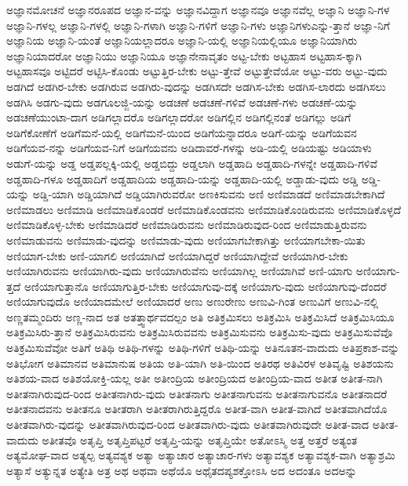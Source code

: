 {ಅಜ್ಞಾನಮೋಚನೆ
ಅಜ್ಞಾನರೂಪದ
ಅಜ್ಞಾನ-ವನ್ನು
ಅಜ್ಞಾನವಿದ್ದಾಗ
ಅಜ್ಞಾನವೂ
ಅಜ್ಞಾನವೆಲ್ಲ
ಅಜ್ಞಾನಿ
ಅಜ್ಞಾನಿ-ಗಳ
ಅಜ್ಞಾನಿ-ಗಳಲ್ಲ
ಅಜ್ಞಾನಿ-ಗಳಲ್ಲಿ
ಅಜ್ಞಾನಿ-ಗಳಾಗಿ
ಅಜ್ಞಾನಿ-ಗಳಿಗೆ
ಅಜ್ಞಾನಿ-ಗಳು
ಅಜ್ಞಾನಿಗಳುಎನ್ನು-ತ್ತಾನೆ
ಅಜ್ಞಾ-ನಿಗೆ
ಅಜ್ಞಾನಿಯ
ಅಜ್ಞಾನಿ-ಯಂತೆ
ಅಜ್ಞಾನಿಯಲ್ಲಾದರೂ
ಅಜ್ಞಾನಿ-ಯಲ್ಲಿ
ಅಜ್ಞಾನಿಯಲ್ಲಿಯೂ
ಅಜ್ಞಾನಿಯಾಗಿರು
ಅಜ್ಞಾನಿಯಾದರೋ
ಅಜ್ಞಾನಿಯು
ಅಜ್ಞಾನಿಯೂ
ಅಜ್ಞಾನೇನಾವೃತಂ
ಅಟ್ಟ-ಬೇಕು
ಅಟ್ಟಹಾಸ
ಅಟ್ಟಹಾಸ-ಕ್ಕಾಗಿ
ಅಟ್ಟಹಾಸವೂ
ಅಟ್ಟಿದರೆ
ಅಟ್ಟಿಸಿ-ಕೊಂಡು
ಅಟ್ಟುತ್ತಿರ-ಬೇಕು
ಅಟ್ಟು-ತ್ತೇವೆ
ಅಟ್ಟುತ್ತೇವೆಯೋ
ಅಟ್ಟು-ವರು
ಅಟ್ಟು-ವುದು
ಅಡಗಿದೆ
ಅಡಗಿರ-ಬೇಕು
ಅಡಗಿರುವ
ಅಡಗಿರು-ವುದನ್ನು
ಅಡಗಿಸದೇ
ಅಡಗಿಸ-ಬೇಕು
ಅಡಗಿಸ-ಲಾರದು
ಅಡಗಿಸಲು
ಅಡಗಿಸಿ
ಅಡಗು-ವುದು
ಅಡಗೂಲಜ್ಜಿ-ಯನ್ನು
ಅಡಚಣೆ
ಅಡಚಣೆ-ಗಳಿವೆ
ಅಡಚಣೆ-ಗಳು
ಅಡಚಣೆ-ಯನ್ನು
ಅಡಚಣೆಯುಂಟಾ-ದಾಗ
ಅಡಿಗಲ್ಲಾದರೊ
ಅಡಿಗಲ್ಲಾದರೋ
ಅಡಿಗಲ್ಲಿನ
ಅಡಿಗಲ್ಲಿನಂತೆ
ಅಡಿಗಲ್ಲು
ಅಡಿಗೆ
ಅಡಿಗೆಕೋಣೆಗೆ
ಅಡಿಗೆಮನೆ-ಯಲ್ಲಿ
ಅಡಿಗೆಮನೆ-ಯಿಂದ
ಅಡಿಗೆಯನ್ನಾದರೂ
ಅಡಿಗೆ-ಯನ್ನು
ಅಡಿಗೆಯವನ
ಅಡಿಗೆಯವ-ನನ್ನು
ಅಡಿಗೆಯವ-ನಿಗೆ
ಅಡಿಗೆಯವನು
ಅಡಿದಾವರೆ-ಗಳನ್ನು
ಅಡಿ-ಯಲ್ಲಿ
ಅಡಿಯಷ್ಟು
ಅಡಿಯಾಳು
ಅಡುಗೆ-ಯನ್ನು
ಅಡ್ಡ
ಅಡ್ಡಪಲ್ಲಕ್ಕಿ-ಯಲ್ಲಿ
ಅಡ್ಡಬಿದ್ದು
ಅಡ್ಡಲಾಗಿ
ಅಡ್ಡಹಾದಿ
ಅಡ್ಡಹಾದಿ-ಗಳನ್ನೇ
ಅಡ್ಡಹಾದಿ-ಗಳಿವೆ
ಅಡ್ಡಹಾದಿ-ಗಳೂ
ಅಡ್ಡಹಾದಿಗೆ
ಅಡ್ಡಹಾದಿಯ
ಅಡ್ಡಹಾದಿ-ಯನ್ನು
ಅಡ್ಡಹಾದಿ-ಯಲ್ಲಿ
ಅಡ್ಡಾಡು-ವುದು
ಅಡ್ಡಿ
ಅಡ್ಡಿ-ಯನ್ನು
ಅಡ್ಡಿ-ಯಾಗಿ
ಅಡ್ಡಿಯಾಗಿದೆ
ಅಡ್ಡಿಯಾಗಿರುವರೋ
ಅಣಕಿಸುವನು
ಅಣಿ
ಅಣಿಮಾಡದೆ
ಅಣಿಮಾಡಬೇಕಾಗಿದೆ
ಅಣಿಮಾಡಲು
ಅಣಿಮಾಡಿ
ಅಣಿಮಾಡಿಕೊಂಡರೆ
ಅಣಿಮಾಡಿಕೊಂಡವನು
ಅಣಿಮಾಡಿಕೊಂಡಿರುವನು
ಅಣಿಮಾಡಿಕೊಳ್ಳದೆ
ಅಣಿಮಾಡಿಕೊಳ್ಳ-ಬೇಕು
ಅಣಿಮಾಡಿದರೆ
ಅಣಿಮಾಡಿರುವನು
ಅಣಿಮಾಡಿರುವುದ-ರಿಂದ
ಅಣಿಮಾಡುತ್ತಿರುವನು
ಅಣಿಮಾಡುವನು
ಅಣಿಮಾಡು-ವುದನ್ನು
ಅಣಿಮಾಡು-ವುದು
ಅಣಿಯಾಗಬೇಕಾಗಿತ್ತು
ಅಣಿಯಾಗಬೇಕಾ-ಯಿತು
ಅಣಿಯಾಗ-ಬೇಕು
ಅಣಿ-ಯಾಗಲಿ
ಅಣಿಯಾಗಿದೆ
ಅಣಿಯಾಗಿದ್ದರೆ
ಅಣಿಯಾಗಿದ್ದೇವೆ
ಅಣಿಯಾಗಿರ-ಬೇಕು
ಅಣಿಯಾಗಿರುವನು
ಅಣಿಯಾಗಿರು-ವುದು
ಅಣಿಯಾಗಿರುವೆನು
ಅಣಿಯಾಗಿಲ್ಲ
ಅಣಿಯಾಗಿವೆ
ಅಣಿ-ಯಾಗು
ಅಣಿಯಾಗು-ತ್ತದೆ
ಅಣಿಯಾಗುತ್ತಾನೊ
ಅಣಿಯಾಗುತ್ತಿರ-ಬೇಕು
ಅಣಿಯಾಗುವು-ದಕ್ಕೆ
ಅಣಿಯಾಗು-ವುದು
ಅಣಿಯಾಗುವು-ದೆಂದರೆ
ಅಣಿಯಾಗುವುದೊ
ಅಣಿಯಾದಮೇಲೆ
ಅಣಿಯಾದರೆ
ಅಣು
ಅಣುರೇಣು
ಅಣುವಿ-ಗಿಂತ
ಅಣುವಿಗೆ
ಅಣುವಿ-ನಲ್ಲಿ
ಅಣ್ಣತಮ್ಮಂದಿರು
ಅಣ್ಣ-ನಾದ
ಅತ
ಅತತ್ತ್ವಾರ್ಥವದಲ್ಪಂ
ಅತಿ
ಅತಿಕ್ರಮಿಸಲು
ಅತಿಕ್ರಮಿಸಿ
ಅತಿಕ್ರಮಿಸಿದೆ
ಅತಿಕ್ರಮಿಸಿಯೂ
ಅತಿಕ್ರಮಿಸಿರು-ತ್ತಾನೆ
ಅತಿಕ್ರಮಿಸಿರುವನು
ಅತಿಕ್ರಮಿಸಿರುವವನು
ಅತಿಕ್ರಮಿಸುವನು
ಅತಿಕ್ರಮಿಸು-ವುದು
ಅತಿಕ್ರಮಿಸುವೆವೊ
ಅತಿಕ್ರಮಿಸುವೆವೋ
ಅತಿಗೆ
ಅತಿಥಿ
ಅತಿಥಿ-ಗಳನ್ನು
ಅತಿಥಿ-ಗಳಿಗೆ
ಅತಿಥಿ-ಯನ್ನು
ಅತಿನೂತನ-ವಾದುದು
ಅತಿಪ್ರಕಾಶ-ವನ್ನು
ಅತಿಭೋಗ
ಅತಿಮಾನವ
ಅತಿಮಾನುಷ
ಅತಿಯ
ಅತಿ-ಯಾಗಿ
ಅತಿ-ಯಿಂದ
ಅತಿರಥ
ಅತಿವಿರಳ
ಅತಿವೃಷ್ಟಿ
ಅತಿಶಯನು
ಅತಿಶಯ-ವಾದ
ಅತಿಶಯೋಕ್ತಿ-ಯಲ್ಲ
ಅತೀ
ಅತೀಂದ್ರಿಯ
ಅತೀಂದ್ರಿಯದ
ಅತೀಂದ್ರಿಯ-ವಾದ
ಅತೀತ
ಅತೀತ-ನಾಗಿ
ಅತೀತನಾಗಿರುವುದ-ರಿಂದ
ಅತೀತನಾಗಿರು-ವುದು
ಅತೀತನಾಗು
ಅತೀತನಾಗುವನು
ಅತೀತನಾಗುವನೊ
ಅತೀತನಾದರೆ
ಅತೀತನಾದವನು
ಅತೀತನೂ
ಅತೀತರಾಗಿ
ಅತೀತರಾಗಿರುತ್ತಿದ್ದರೊ
ಅತೀತ-ವಾಗಿ
ಅತೀತ-ವಾಗಿದೆ
ಅತೀತವಾಗಿದೆಯೊ
ಅತೀತವಾಗಿರು-ವುದನ್ನು
ಅತೀತವಾಗಿರುವುದ-ರಿಂದ
ಅತೀತವಾಗಿರು-ವುದು
ಅತೀತವಾಗಿರುವುದೇ
ಅತೀತ-ವಾದ
ಅತೀತ-ವಾದುದು
ಅತೀತವೊ
ಅತೃಪ್ತಿ
ಅತೃಪ್ತಿಪಟ್ಟರೆ
ಅತೃಪ್ತಿ-ಯನ್ನು
ಅತೃಪ್ತಿಯೇ
ಅತೋಽಸ್ಮಿ
ಅತ್ತ
ಅತ್ತರೆ
ಅತ್ಯಂತ
ಅತ್ಯಮೋಘ-ವಾದ
ಅತ್ಯಲ್ಪ
ಅತ್ಯವಶ್ಯಕ
ಅತ್ಯಾ
ಅತ್ಯಾಚಾರ
ಅತ್ಯಾಚಾರ-ಗಳು
ಅತ್ಯಾವಶ್ಯಕ
ಅತ್ಯಾವಶ್ಯಕ-ವಾಗಿ
ಅತ್ಯಾಶ್ರಮಿ
ಅತ್ಯಾಸೆ
ಅತ್ಯುನ್ನತ
ಅತ್ಯೇತಿ
ಅತ್ರ
ಅಥ
ಅಥವಾ
ಅಥೆಯೊ
ಅಥೈತದಪ್ಯಶಕ್ತೋಽಸಿ
ಅದ
ಅದಂತೂ
ಅದಅನ್ನು
}
